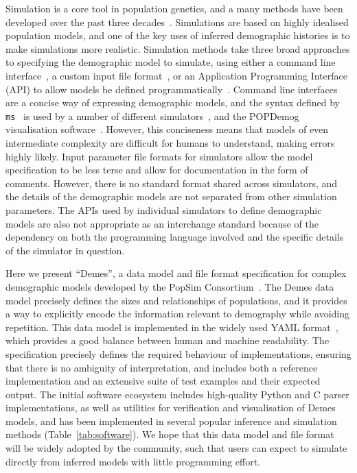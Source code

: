 \documentclass[11pt]{article}
\newcommand{\ms}[0]{\texttt{ms}}
\begin{document}
Simulation is a core tool in population genetics, and a
many methods have been developed over the past three
decades~\citep{carvajal2008simulation,liu2008survey,
arenas2012simulation,yuan2012overview,hoban2012computer}.
Simulations are based on highly idealised population models,
and one of the key uses of inferred demographic histories
is to make simulations more realistic.
Simulation methods take three broad approaches to specifying
the demographic model to simulate,
using either a command line
interface~\citep[e.g.,][]{hudson2002generating,kern2016discoal},
a custom input file
format~\citep[e.g.,][]{guillaume2006nemo,excoffier2011fastsimcoal,shlyakhter2014cosi2},
or an Application Programming Interface (API) to allow
models be defined programmatically~\citep[e.g.,][]{
thornton2014cpp,thornton2019-nu,baumdicker2021-iu,kelleher2016efficient,
becheler2019quetzal,haller2019slim}.
Command line interfaces are a concise way of expressing
demographic models, and the syntax defined by \ms~\citep{hudson2002generating}
is used by a number of different
simulators~\citep[e.g.,][]{ewing2010msms,chen2009fast,staab2015scrm},
and the POPDemog visualisation software~\citep{zhou2018popdemog}.
However, this conciseness means that models of even intermediate complexity
are difficult for humans to understand, making errors highly likely.
Input parameter file formats for simulators allow the model specification
to be less terse and allow for documentation in the form of comments.
However, there is no standard format shared across simulators,
and the details of the demographic models are not separated
from other simulation parameters.
The APIs used by individual simulators to define demographic models are also
not appropriate as an interchange standard because of the dependency on both
the programming language involved
and the specific details of the simulator in question.

Here we present ``Demes'', a data model and file format specification for
complex demographic models developed by the
PopSim Consortium~\citep{adrion2020community}.
The Demes data model precisely defines the sizes and relationships
of populations, and it provides a way to explicitly encode the
information relevant to demography while avoiding repetition.
This data model is implemented in the widely used YAML
format~\citep{ben2009yaml}, which provides a good balance between human
and machine readability.
The specification precisely defines the required behaviour of implementations,
ensuring that there is no ambiguity of interpretation, and includes both a
reference implementation and an extensive suite of test examples and their
expected output.
The initial software ecosystem includes high-quality Python
and C parser implementations, as well as utilities for verification and
visualisation of Demes models, and has been implemented in several popular
inference and simulation methods (Table~\ref{tab:software}).
We hope that this data model and file format will be widely adopted
by the community, such that users can expect to simulate directly
from inferred models with little programming effort.
\end{document}

